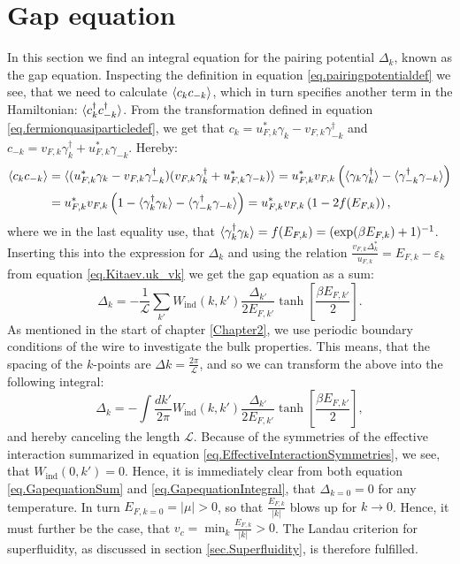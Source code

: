 \section{Gap equation} \label{sec.pairingpotential.integralequation}
In this section we find an integral equation for the pairing potential $\Delta_k$, known as the gap equation. Inspecting the definition in equation \eqref{eq.pairingpotentialdef} we see, that we need to calculate $\braket{ c_k c_{-k} }$, which in turn specifies another term in the Hamiltonian: $\braket{ c^\dagger_k c^\dagger_{-k} }$. From the transformation defined in equation \eqref{eq.fermionquasiparticledef}, we get that $c_k = u^*_{F,k}\gamma_k - v_{F,k}\gamma^\dagger_{-k}$ and $c_{-k} = v_{F,k}\gamma^\dagger_k + u^*_{F,k}\gamma_{-k}$. Hereby:
\begin{align}
\braket{c_k c_{-k}} &= \braket{ (u^*_{F,k}\gamma_k - v_{F,k}\gamma^\dagger_{-k}) (v_{F,k}\gamma^\dagger_k + u^*_{F,k}\gamma_{-k}) } = u^*_{F,k}v_{F,k}\left( \braket{ \gamma_k \gamma^\dagger_{k} } - \braket{ \gamma^\dagger_{-k} \gamma_{-k} } \right)  \nonumber \\
& =  u^*_{F,k}v_{F,k}\left( 1 - \braket{ \gamma^\dagger_{k} \gamma_k } - \braket{ \gamma^\dagger_{-k} \gamma_{-k} } \right) = u^*_{F,k}v_{F,k}\left(1 - 2f(E_{F,k})\right), \nonumber
\end{align}
where we in the last equality use, that $\braket{ \gamma^\dagger_{k} \gamma_{k} }= f(E_{F,k})=(\exp(\beta E_{F,k})+1)^{-1} $. Inserting this into the expression for $\Delta_k$ and using the relation $\frac{v_{F,k}\Delta^*_k}{u_{F,k}}=E_{F,k}-\varepsilon_k$ from equation \eqref{eq.Kitaev.uk_vk} we get the gap equation as a sum:
\begin{equation}
\Delta_k = - \frac{1}{\mathcal{L}}\sum_{k'} W_{\text{ind}}(k,k')\frac{\Delta_{k'}}{2E_{F,k'}}\tanh\left[\frac{\beta E_{F,k'}}{2}\right].
\label{eq.GapequationSum}
\end{equation} 
As mentioned in the start of chapter \ref{Chapter2}, we use periodic boundary conditions of the wire to investigate the bulk properties. This means, that the spacing of the $k$-points are $\Delta k = \frac{2\pi}{\mathcal{L}}$, and so we can transform the above into the following integral:
\begin{equation}
\Delta_k = - \int \frac{dk'}{2\pi} W_{\text{ind}}(k,k')\frac{\Delta_{k'}}{2E_{F,k'}}\tanh\left[\frac{\beta E_{F,k'}}{2}\right], 
\label{eq.GapequationIntegral}
\end{equation} 
and hereby canceling the length $\mathcal{L}$. Because of the symmetries of the effective interaction summarized in equation \eqref{eq.EffectiveInteractionSymmetries}, we see, that $W_{\text{ind}}(0,k') = 0$. Hence, it is immediately clear from both equation \eqref{eq.GapequationSum} and \eqref{eq.GapequationIntegral}, that $\Delta_{k=0} = 0$ for any temperature. In turn $E_{F, k=0} = |\mu| > 0$, so that $\frac{E_{F,k}}{|k|}$ blows up for $k\to 0$. Hence, it must further be the case, that $v_c = \min_k \frac{E_{F,k}}{|k|} > 0$. The Landau criterion for superfluidity, as discussed in section \ref{sec.Superfluidity}, is therefore fulfilled. 

